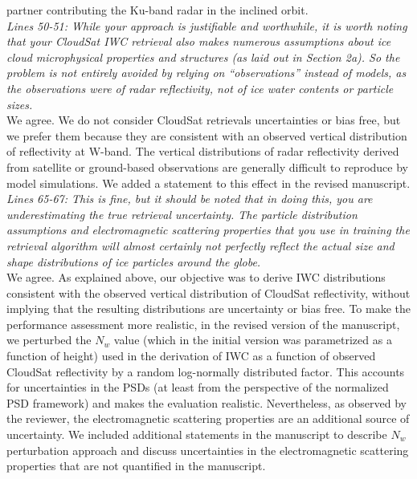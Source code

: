 \documentclass[12pt]{article}
\begin{document}
partner contributing the Ku-band radar in the inclined orbit.\\
\newline
\textit{Lines 50-51: While your approach is justifiable and worthwhile, it is worth noting that your CloudSat IWC retrieval 
also makes numerous assumptions about ice cloud microphysical properties and structures (as laid out in Section 2a). 
So the problem is not entirely avoided by relying on “observations” instead of models, as the observations were of 
radar reflectivity, not of ice water contents or particle sizes.}\\
\newline
We agree. We do not consider CloudSat retrievals uncertainties or bias free, but we prefer them because
they are consistent with an observed vertical distribution of reflectivity at W-band. The vertical distributions of radar reflectivity
derived from satellite or ground-based observations are generally difficult to reproduce by model simulations. We added a statement 
to this effect in the revised manuscript.\\
\newline
\textit{Lines 65-67: This is fine, but it should be noted that in doing this, you are underestimating the true retrieval 
uncertainty. The particle distribution assumptions and electromagnetic scattering properties that you use in training 
the retrieval algorithm will almost certainly not perfectly reflect the actual size and shape distributions of ice 
particles around the globe.}\\
\newline
We agree. As explained above, our  objective was to derive IWC distributions consistent with the observed vertical distribution of
CloudSat reflectivity, without implying that the resulting distributions are uncertainty or bias free.  To make the performance
assessment more realistic, in the revised version of the manuscript, we perturbed the $N_w$ value (which in the initial version was
parametrized as a function of height) used in the derivation of IWC as a function of observed CloudSat reflectivity by a random log-normally
distributed factor. This accounts for uncertainties in the PSDs (at least from the perspective of the normalized PSD framework) and 
makes the evaluation realistic. Nevertheless, as observed by the reviewer, the electromagnetic scattering properties are 
an additional source of uncertainty.  We included additional statements in the manuscript to describe $N_w$ perturbation approach and
discuss uncertainties in the electromagnetic scattering properties that are not quantified in the manuscript.\\ 
\end{document}
